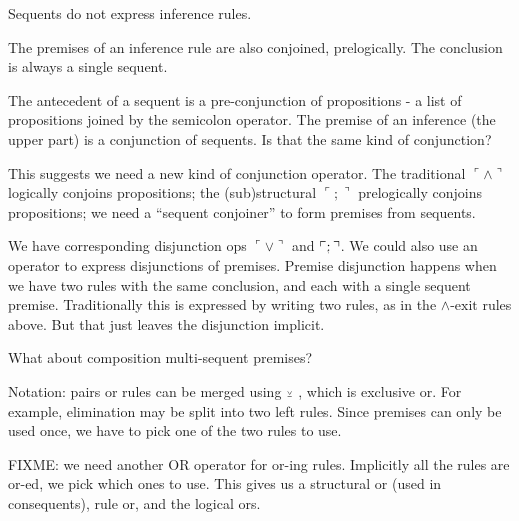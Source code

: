 \documentclass{article}
\begin{document}
Sequents do not express inference rules.

The premises of an inference rule are also conjoined, prelogically.
The conclusion is always a single sequent.

The antecedent of a sequent is a pre-conjunction of propositions - a
list of propositions joined by the semicolon operator. The premise of
an inference (the upper part) is a conjunction of sequents. Is that
the same kind of conjunction?

This suggests we need a new kind of conjunction operator. The
traditional \(\ulcorner\land\urcorner\) logically conjoins propositions; the
(sub)structural \(\ulcorner ;\urcorner\) prelogically conjoins propositions; we need a
``sequent conjoiner'' to form premises from sequents.

We have corresponding disjunction ops \(\ulcorner\lor\urcorner\) and
\(\ulcorner\structor\urcorner\). We could also use an operator to
express disjunctions of premises. Premise disjunction happens when we
have two rules with the same conclusion, and each with a single
sequent premise. Traditionally this is expressed by writing two rules, as in the \(\land\text{-exit}\) rules above.
But that just leaves the disjunction implicit.

What about composition multi-sequent premises?

Notation: pairs or rules can be merged using \(\scriptscriptstyle\veebar\ \), which is
exclusive or. For example, elimination may be split into two left
rules. Since premises can only be used once, we have to pick one of
the two rules to use.

FIXME: we need another OR operator for or-ing rules. Implicitly all
the rules are or-ed, we pick which ones to use. This gives us a
structural or (used in consequents), rule or, and the logical ors.




\end{document}
